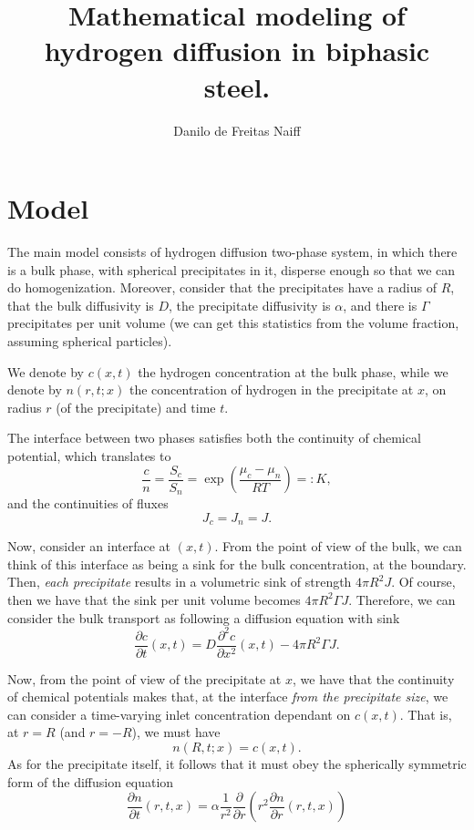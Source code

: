 \documentclass[]{article}
\title{Mathematical modeling of hydrogen diffusion in biphasic steel.}
\author{Danilo de Freitas Naiff}
\newcommand{\pderiv}[2]{\frac{\partial #1}{\partial #2}}
\begin{document}
\maketitle

\begin{abstract}

\end{abstract}

\section{Model}
The main model consists of hydrogen diffusion two-phase system, in which there is a bulk phase, with spherical precipitates in it, disperse enough so that we can do homogenization. Moreover, consider that the precipitates have a radius of $R$, that the bulk diffusivity is $D$, the precipitate diffusivity is $\alpha$, and there is $\Gamma$ precipitates per unit volume (we can get this statistics from the volume fraction, assuming spherical particles).

We denote by $c(x, t)$ the hydrogen concentration at the bulk phase, while we denote by $n(r, t; x)$ the concentration of hydrogen in the precipitate at $x$, on radius $r$ (of the precipitate) and time $t$.
 
The interface between two phases satisfies both the continuity of chemical potential, which translates to
\begin{equation}
	\frac{c}{n} = \frac{S_c}{S_n} = \exp \left( \frac{\mu_c - \mu_n}{RT} \right) =: K,
\end{equation}
and the continuities of fluxes
\begin{equation}
	J_c = J_n = J.
\end{equation}

Now, consider an interface at $(x, t)$. From the point of view of the bulk, we can think of this interface as being a sink for the bulk concentration, at the boundary. Then, \textit{each precipitate} results in a volumetric sink of strength $4 \pi R^2 J$. Of course, then we have that the sink per unit volume becomes $4 \pi R^2 \Gamma J$. Therefore, we can consider the bulk transport as following a diffusion equation with sink
\begin{equation}
	\pderiv{c}{t}(x,t) = D \frac{\partial^2 c}{\partial x^2}(x,t) - 4 \pi R^2 \Gamma J.
\end{equation}

Now, from the point of view of the precipitate at $x$, we have that the continuity of chemical potentials makes that, at the interface \textit{from the precipitate size}, we can consider a time-varying inlet concentration dependant on $c(x,t)$. That is, at $r = R$ (and $r = -R$), we must have
\begin{equation}
	n(R, t; x) = c(x, t).
\end{equation}
As for the precipitate itself, it follows that it must obey the spherically symmetric form of the diffusion equation 
\begin{equation}
	\pderiv{n}{t}(r,t,x) = \alpha \frac{1}{r^2} \pderiv{}{r} \left( r^2 \pderiv{n}{r}(r,t,x)\right)
\end{equation}
\end{document}
